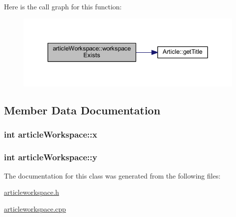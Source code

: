 Here is the call graph for this function\+:
\nopagebreak
\begin{figure}[H]
\begin{center}
\leavevmode
\includegraphics[width=343pt]{classarticle_workspace_a3404625169597df8daceb033cc64cf02_cgraph}
\end{center}
\end{figure}




\subsection{Member Data Documentation}
\hypertarget{classarticle_workspace_a99462fde9a912cea8cdbf6ce4d15ae95}{}
\subsubsection[{x}]{\setlength{\rightskip}{0pt plus 5cm}int article\+Workspace\+::x}\label{classarticle_workspace_a99462fde9a912cea8cdbf6ce4d15ae95}
\hypertarget{classarticle_workspace_aa790c78612eb2648187e5ba98282219d}{}
\subsubsection[{y}]{\setlength{\rightskip}{0pt plus 5cm}int article\+Workspace\+::y}\label{classarticle_workspace_aa790c78612eb2648187e5ba98282219d}


The documentation for this class was generated from the following files\+:\begin{DoxyCompactItemize}
\item 
\hyperlink{articleworkspace_8h}{articleworkspace.\+h}\item 
\hyperlink{articleworkspace_8cpp}{articleworkspace.\+cpp}\end{DoxyCompactItemize}
